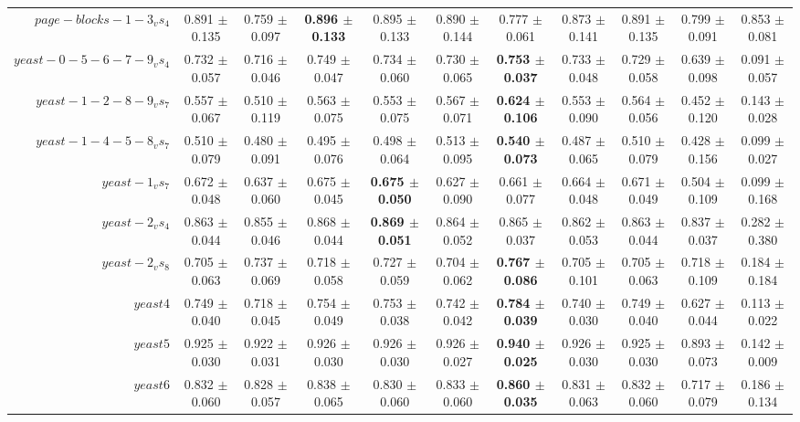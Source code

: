 \begin{table}[!ht]
{\begin{tabular}{r c c c c c c c c c c}
$page-blocks-1-3_vs_4$ & 0.891 $\pm$ 0.135 & 0.759 $\pm$ 0.097 & \textbf{0.896 $\pm$ 0.133} & 0.895 $\pm$ 0.133 & 0.890 $\pm$ 0.144 & 0.777 $\pm$ 0.061 & 0.873 $\pm$ 0.141 & 0.891 $\pm$ 0.135 & 0.799 $\pm$ 0.091 & 0.853 $\pm$ 0.081 \\
$yeast-0-5-6-7-9_vs_4$ & 0.732 $\pm$ 0.057 & 0.716 $\pm$ 0.046 & 0.749 $\pm$ 0.047 & 0.734 $\pm$ 0.060 & 0.730 $\pm$ 0.065 & \textbf{0.753 $\pm$ 0.037} & 0.733 $\pm$ 0.048 & 0.729 $\pm$ 0.058 & 0.639 $\pm$ 0.098 & 0.091 $\pm$ 0.057 \\
$yeast-1-2-8-9_vs_7$ & 0.557 $\pm$ 0.067 & 0.510 $\pm$ 0.119 & 0.563 $\pm$ 0.075 & 0.553 $\pm$ 0.075 & 0.567 $\pm$ 0.071 & \textbf{0.624 $\pm$ 0.106} & 0.553 $\pm$ 0.090 & 0.564 $\pm$ 0.056 & 0.452 $\pm$ 0.120 & 0.143 $\pm$ 0.028 \\
$yeast-1-4-5-8_vs_7$ & 0.510 $\pm$ 0.079 & 0.480 $\pm$ 0.091 & 0.495 $\pm$ 0.076 & 0.498 $\pm$ 0.064 & 0.513 $\pm$ 0.095 & \textbf{0.540 $\pm$ 0.073} & 0.487 $\pm$ 0.065 & 0.510 $\pm$ 0.079 & 0.428 $\pm$ 0.156 & 0.099 $\pm$ 0.027 \\
$yeast-1_vs_7$ & 0.672 $\pm$ 0.048 & 0.637 $\pm$ 0.060 & 0.675 $\pm$ 0.045 & \textbf{0.675 $\pm$ 0.050} & 0.627 $\pm$ 0.090 & 0.661 $\pm$ 0.077 & 0.664 $\pm$ 0.048 & 0.671 $\pm$ 0.049 & 0.504 $\pm$ 0.109 & 0.099 $\pm$ 0.168 \\
$yeast-2_vs_4$ & 0.863 $\pm$ 0.044 & 0.855 $\pm$ 0.046 & 0.868 $\pm$ 0.044 & \textbf{0.869 $\pm$ 0.051} & 0.864 $\pm$ 0.052 & 0.865 $\pm$ 0.037 & 0.862 $\pm$ 0.053 & 0.863 $\pm$ 0.044 & 0.837 $\pm$ 0.037 & 0.282 $\pm$ 0.380 \\
$yeast-2_vs_8$ & 0.705 $\pm$ 0.063 & 0.737 $\pm$ 0.069 & 0.718 $\pm$ 0.058 & 0.727 $\pm$ 0.059 & 0.704 $\pm$ 0.062 & \textbf{0.767 $\pm$ 0.086} & 0.705 $\pm$ 0.101 & 0.705 $\pm$ 0.063 & 0.718 $\pm$ 0.109 & 0.184 $\pm$ 0.184 \\
$yeast4$ & 0.749 $\pm$ 0.040 & 0.718 $\pm$ 0.045 & 0.754 $\pm$ 0.049 & 0.753 $\pm$ 0.038 & 0.742 $\pm$ 0.042 & \textbf{0.784 $\pm$ 0.039} & 0.740 $\pm$ 0.030 & 0.749 $\pm$ 0.040 & 0.627 $\pm$ 0.044 & 0.113 $\pm$ 0.022 \\
$yeast5$ & 0.925 $\pm$ 0.030 & 0.922 $\pm$ 0.031 & 0.926 $\pm$ 0.030 & 0.926 $\pm$ 0.030 & 0.926 $\pm$ 0.027 & \textbf{0.940 $\pm$ 0.025} & 0.926 $\pm$ 0.030 & 0.925 $\pm$ 0.030 & 0.893 $\pm$ 0.073 & 0.142 $\pm$ 0.009 \\
$yeast6$ & 0.832 $\pm$ 0.060 & 0.828 $\pm$ 0.057 & 0.838 $\pm$ 0.065 & 0.830 $\pm$ 0.060 & 0.833 $\pm$ 0.060 & \textbf{0.860 $\pm$ 0.035} & 0.831 $\pm$ 0.063 & 0.832 $\pm$ 0.060 & 0.717 $\pm$ 0.079 & 0.186 $\pm$ 0.134 \\

\end{tabular}}
\end{table}
